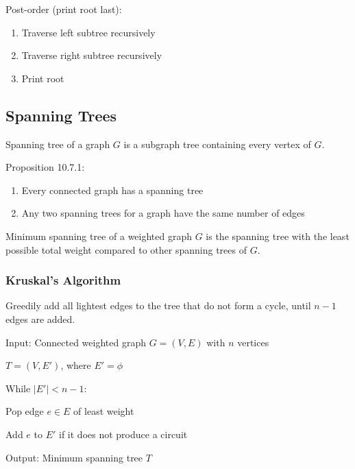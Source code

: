 \documentclass[12pt, a4paper]{article}
\begin{document}
\begin{multicols*}{3}
Post-order (print root last):
\begin{enumerate}[\roman*.]
  \item Traverse left subtree recursively
  \item Traverse right subtree recursively
  \item Print root
\end{enumerate}
\subsection{Spanning Trees}
Spanning tree of a graph $G$ is a subgraph tree containing every vertex of $G$.

Proposition 10.7.1:
\begin{enumerate}[\roman*.]
  \item Every connected graph has a spanning tree
  \item Any two spanning trees for a graph have the same number of edges
\end{enumerate}

Minimum spanning tree of a weighted graph $G$ is the spanning tree with the least possible total weight compared to other spanning trees of $G$.
\colbreak
\subsubsection{Kruskal's Algorithm}
Greedily add all lightest edges to the tree that do not form a cycle, until $n-1$ edges are added.
\begin{enumproof}[parsep=0em]
  \item Input: Connected weighted graph $G = (V, E)$ with $n$ vertices
  \item $T = (V, E')$, where $E' = \phi$
  \item While $|E'| < n - 1$:
    \begin{enumproof}[parsep=0em]
    \item Pop edge $e \in E$ of least weight
    \item Add $e$ to $E'$ if it does not produce a circuit
    \end{enumproof}
  \item Output: Minimum spanning tree $T$
\end{enumproof}


\end{multicols*}
\end{document}
